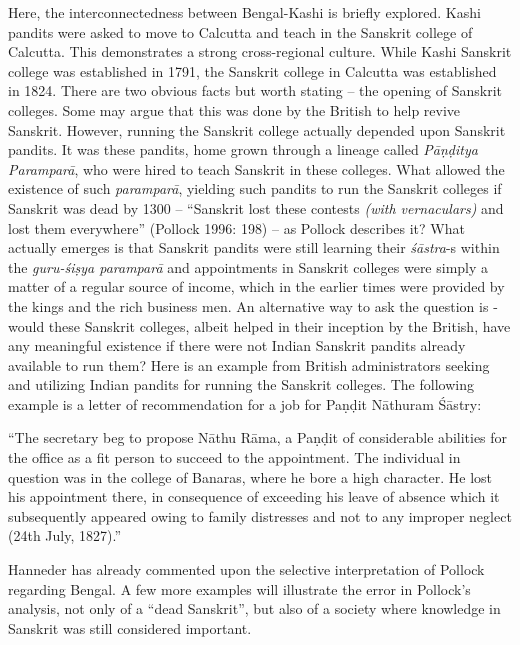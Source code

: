 Here, the interconnectedness between Bengal-Kashi is briefly explored. Kashi pandits were asked to move to Calcutta and teach in the Sanskrit college of Calcutta. This demonstrates a strong cross-regional culture. While Kashi Sanskrit college was established in 1791, the Sanskrit college in Calcutta was established in 1824. There are two obvious facts but worth stating – the opening of Sanskrit colleges. Some may argue that this was done by the British to help revive Sanskrit. However, running the Sanskrit college actually depended upon Sanskrit pandits. It was these pandits, home grown through a lineage called \textit{Pāṇḍitya Paramparā}, who were hired to teach Sanskrit in these colleges. What allowed the existence of such \textit{paramparā}, yielding such pandits to run the Sanskrit colleges if Sanskrit was dead by 1300 – “Sanskrit lost these contests \textit{(with vernaculars)} and lost them everywhere” (Pollock 1996: 198) – as Pollock describes it? What actually emerges is that Sanskrit pandits were still learning their \textit{śāstra}-s within the \textit{guru-śiṣya paramparā} and appointments in Sanskrit colleges were simply a matter of a regular source of income, which in the earlier times were provided by the kings and the rich business men. An alternative way to ask the question is - would these Sanskrit colleges, albeit helped in their inception by the British, have any meaningful existence if there were not Indian Sanskrit pandits already available to run them? Here is an example from British administrators seeking and utilizing Indian pandits for running the Sanskrit colleges. The following example is a letter of recommendation for a job for Paṇḍit Nāthuram Śāstry:

\begin{myquote}
“The secretary beg to propose Nāthu Rāma, a Paṇḍit of considerable abilities for the office as a fit person to succeed to the appointment. The individual in question was in the college of Banaras, where he bore a high character. He lost his appointment there, in consequence of exceeding his leave of absence which it subsequently appeared owing to family distresses and not to any improper neglect (24th July, 1827).”
\end{myquote}

Hanneder has already commented upon the selective interpretation of Pollock regarding Bengal. A few more examples will illustrate the error in Pollock’s analysis, not only of a “dead Sanskrit”, but also of a society where knowledge in Sanskrit was still considered important.


